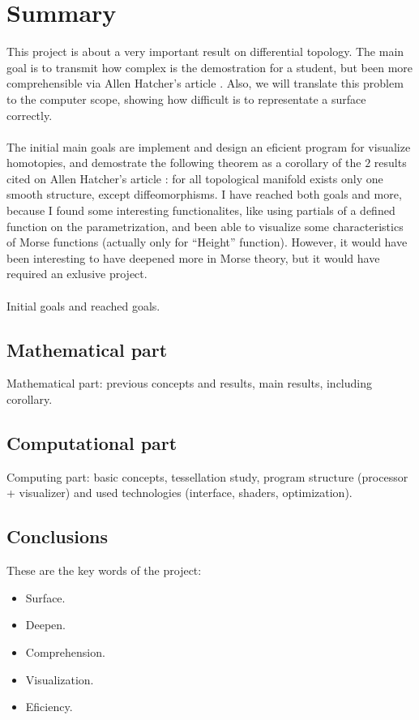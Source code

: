 %

\chapter{Summary}
This project is about a very important result on differential topology. The main goal is to transmit how complex is the demostration for a student, but been more comprehensible via Allen Hatcher's article \cite{arXiv:1312.3518}. Also, we will translate this problem to the computer scope, showing how difficult is to representate a surface correctly.\\
\\The initial main goals are implement and design an eficient program for visualize homotopies, and demostrate the following theorem as a corollary of the $2$ results cited on Allen Hatcher's article \cite{arXiv:1312.3518}: for all topological manifold exists only one smooth structure, except diffeomorphisms. I have reached both goals and more, because I found some interesting functionalites, like using partials of a defined function on the parametrization, and been able to visualize some characteristics of Morse functions (actually only for ``Height'' function). However, it would have been interesting to have deepened more in Morse theory, but it would have required an exlusive project.\\
\\Initial goals and reached goals.

\section*{Mathematical part}
Mathematical part: previous concepts and results, main results, including corollary.

\section*{Computational part}
Computing part: basic concepts, tessellation study, program structure (processor + visualizer) and used technologies (interface, shaders, optimization).\\

\section*{Conclusions}
These are the key words of the project:
\begin{itemize}
	\item Surface.
	\item Deepen.
	\item Comprehension.
	\item Visualization.
	\item Eficiency.
\end{itemize}

\endinput
